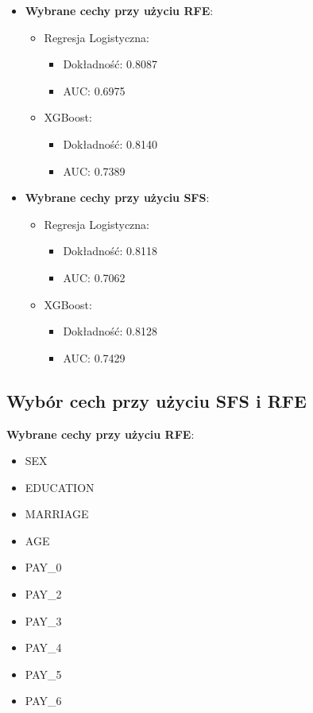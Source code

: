 \documentclass{article}
\begin{document}
\begin{itemize}
    \item \textbf{Wybrane cechy przy użyciu RFE}:
          \begin{itemize}
              \item Regresja Logistyczna:
                    \begin{itemize}
                        \item Dokładność: 0.8087
                        \item AUC: 0.6975
                    \end{itemize}
              \item XGBoost:
                    \begin{itemize}
                        \item Dokładność: 0.8140
                        \item AUC: 0.7389
                    \end{itemize}
          \end{itemize}
    \item \textbf{Wybrane cechy przy użyciu SFS}:
          \begin{itemize}
              \item Regresja Logistyczna:
                    \begin{itemize}
                        \item Dokładność: 0.8118
                        \item AUC: 0.7062
                    \end{itemize}
              \item XGBoost:
                    \begin{itemize}
                        \item Dokładność: 0.8128
                        \item AUC: 0.7429
                    \end{itemize}
          \end{itemize}
\end{itemize}

\subsection{Wybór cech przy użyciu SFS i RFE}
\textbf{Wybrane cechy przy użyciu RFE}:
\begin{itemize}
    \item SEX
    \item EDUCATION
    \item MARRIAGE
    \item AGE
    \item PAY\_0
    \item PAY\_2
    \item PAY\_3
    \item PAY\_4
    \item PAY\_5
    \item PAY\_6
\end{itemize}
\end{document}
